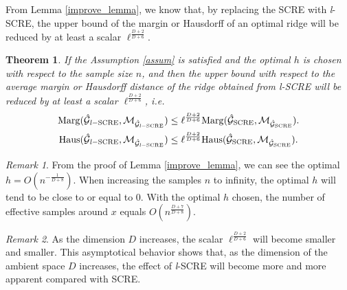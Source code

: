 \documentclass[aos,preprint]{imsart}
\newtheorem{theorem}{Theorem}[section]
\theoremstyle{remark}
\newtheorem*{remark}{Remark}
\begin{document}
From Lemma \ref{improve_lemma}, we know that, by replacing the SCRE with {\it l}-SCRE, the upper bound of the margin or Hausdorff of an optimal ridge will be reduced by at least a scalar $\ell^{\frac{D+2}{D+6}}$.
\begin{theorem} If the Assumption \ref{assum} is satisfied and the optimal $h$ is chosen with respect to the sample size $n$, %
and then the upper bound with respect to the average margin or Hausdorff distance of the ridge obtained from {\it l}-SCRE will be reduced by at least a scalar $\ell^{\frac{D+2}{D+6}}$,  i.e. 
\begin{gather*}
{\rm Marg}(\hat{\cal G}_{{\it l-}{\rm SCRE}}, {\cal M}_{\hat{\cal G}_{{\it l}-{\rm SCRE}}}) \leq \ell^{\frac{D+2}{D+6}} {\rm Marg}(\hat{\cal G}_{\rm SCRE}, {\cal M}_{\hat{\cal G}_{\rm SCRE}}).\\
{\rm Haus}(\hat{\cal G}_{{\it l-}{\rm SCRE}}, {\cal M}_{\hat{\cal G}_{{\it l}-{\rm SCRE}}}) \leq \ell^{\frac{D+2}{D+6}} {\rm Haus}(\hat{\cal G}_{\rm SCRE}, {\cal M}_{\hat{\cal G}_{\rm SCRE}}).
\end{gather*}
\end{theorem}
\begin{remark}
From the proof of Lemma \ref{improve_lemma}, we can see the optimal $h=O(n^{-\frac{1}{D+8}})$.  When increasing the samples $n$ to infinity, the optimal $h$ will tend to be close to or equal to 0. With the optimal $h$ chosen, the number of effective samples around $x$ equals $O(n^\frac{D+7}{D+8})$.
\end{remark}
\begin{remark}
As the dimension $D$ increases, the scalar $\ell^{\frac{D+2}{D+6}}$ will become smaller and smaller. This asymptotical behavior shows that, as the dimension of the ambient space $D$ increases, the effect of {\it l}-SCRE will become more and more apparent compared with SCRE.
\end{remark}
\end{document}
